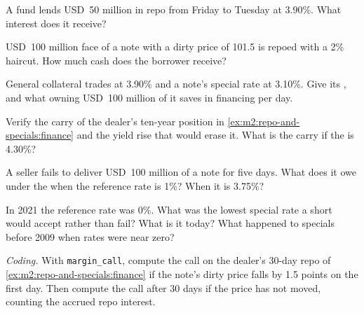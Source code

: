 \begin{exercise}[$\star$]\label{exo:m2:repo-and-specials:1}
A fund lends USD~50 million in repo from Friday to Tuesday at 3.90\%. What
interest does it receive?
\end{exercise}

\begin{exercise}[$\star$]\label{exo:m2:repo-and-specials:2}
USD~100 million face of a note with a dirty price of 101.5 is repoed with a 2\%
haircut. How much cash does the borrower receive?
\end{exercise}

\begin{exercise}[$\star$]\label{exo:m2:repo-and-specials:3}
General collateral trades at 3.90\% and a note's special rate at 3.10\%. Give
its , and what owning USD~100 million of it saves in financing per
day.
\end{exercise}

\begin{exercise}[$\star\star$]\label{exo:m2:repo-and-specials:4}
Verify the carry of the dealer's ten-year position in
\cref{ex:m2:repo-and-specials:finance} and the yield rise that would erase it.
What is the carry if the  is 4.30\%?
\end{exercise}

\begin{exercise}[$\star\star$]\label{exo:m2:repo-and-specials:5}
A seller fails to deliver USD~100 million of a note for five days. What does it
owe under the  when the reference rate is 1\%? When it is 3.75\%?
\end{exercise}

\begin{exercise}[$\star\star$]\label{exo:m2:repo-and-specials:6}
In 2021 the reference rate was 0\%. What was the lowest special rate a short
would accept rather than fail? What is it today? What happened to specials
before 2009 when rates were near zero?
\end{exercise}

\begin{exercise}[$\star\star\star$]\label{exo:m2:repo-and-specials:7}
\emph{Coding.} With \texttt{margin\_call}, compute the call on the dealer's
30-day repo of \cref{ex:m2:repo-and-specials:finance} if the note's dirty price
falls by 1.5 points on the first day. Then compute the call after 30 days if
the price has not moved, counting the accrued repo interest.
\end{exercise}

